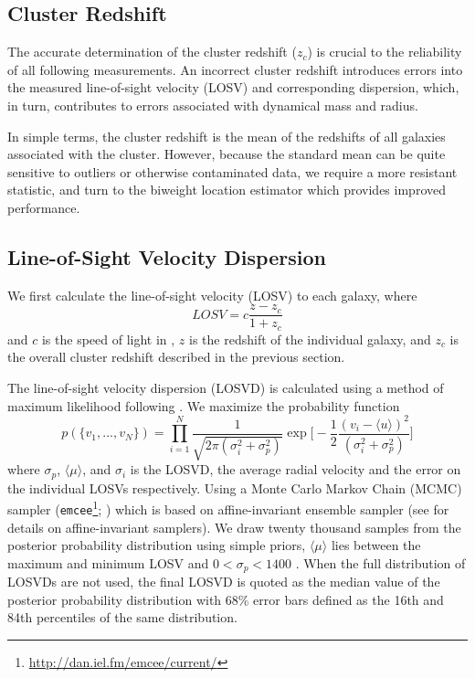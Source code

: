 \documentclass[fleqn,usenatbib]{mnras}
\begin{document}
\subsection{Cluster Redshift}
The accurate determination of the cluster redshift ($z_c$) is crucial to the reliability of all following measurements. An incorrect cluster redshift introduces errors into the measured line-of-sight velocity (LOSV) and corresponding dispersion, which, in turn, contributes to errors associated with dynamical mass and radius. 

In simple terms, the cluster redshift is the mean of the redshifts of all galaxies associated with the cluster. However, because the standard mean can be quite sensitive to outliers or otherwise contaminated data, we require a more resistant statistic, and turn to the biweight location estimator \citep{Beers1990} which provides improved performance. 

\subsection{Line-of-Sight Velocity Dispersion}\label{sec: LOSVD}
We first calculate the line-of-sight velocity (LOSV) to each galaxy, where
\begin{equation}
	LOSV = c\frac{z - z_c}{1+z_c}
\end{equation}
and $c$ is the speed of light in \kms, $z$ is the redshift of the individual galaxy, and $z_c$ is the overall cluster redshift described in the previous section.

The line-of-sight velocity dispersion (LOSVD) is calculated using a method of maximum likelihood following \cite{Walker2006}. We maximize the probability function 
\begin{equation}\label{eq: jointGaussian}
p(\{v_1, ..., v_N\})=\displaystyle\prod_{i=1}^{N}\frac{1}{\sqrt{2\pi(\sigma_i^2+\sigma_p^2)}}\exp\biggl[-\frac{1}{2}\frac{(v_i-\langle u \rangle)^2}{(\sigma_i^2+\sigma_p^2)}\biggr]
\end{equation}
where $\sigma_p$, $\langle\mu\rangle$, and $\sigma_i$ is the LOSVD, the average radial velocity and the error on the individual LOSVs respectively. Using a Monte Carlo Markov Chain (MCMC) sampler ({\tt emcee}\footnote{\url{http://dan.iel.fm/emcee/current/}}; \citealt{Foreman-Mackey2013}) which is based on affine-invariant ensemble sampler (see \citealt{Goodman2010} for details on affine-invariant samplers). We draw twenty thousand samples from the posterior probability distribution using simple priors, $\langle\mu\rangle$ lies between the maximum and minimum LOSV and $0< \sigma_p < 1400$ \kms. When the full distribution of LOSVDs are not used, the final LOSVD is quoted as the median value of the posterior probability distribution with 68\% error bars defined as the 16th and 84th percentiles of the same distribution.
\end{document}
